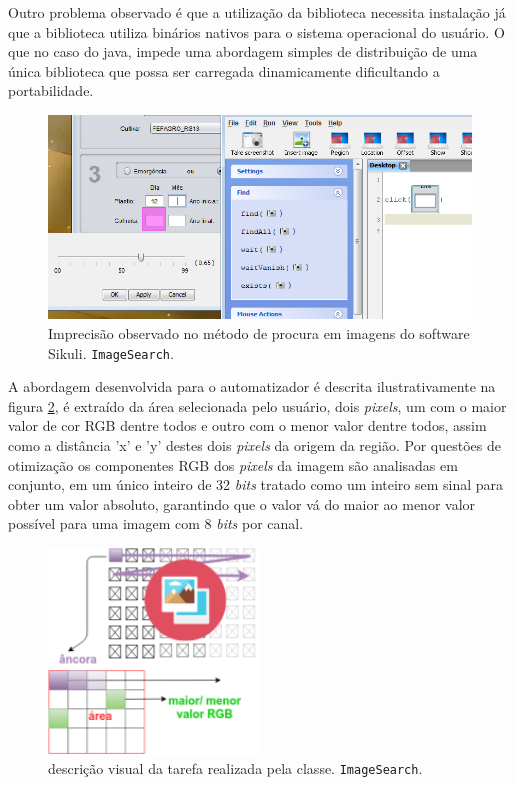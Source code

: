 \documentclass[tg]{mdtufsm}
\begin{document}
                    Outro problema observado é que a utilização da biblioteca necessita instalação já que a biblioteca utiliza binários nativos para o sistema operacional do usuário. O que no caso do java, impede uma abordagem simples de distribuição de uma única biblioteca que possa ser carregada dinamicamente dificultando a portabilidade.

                    \begin{figure}[!htb]
                        {\centering
                        \includegraphics[width=1.0\textwidth]{imagens/a.png}
                        \caption{Imprecisão observado no método de procura em imagens do software Sikuli. \texttt{ImageSearch}.}
                        \label{fig:sikulixNoMatch}}
                    \end{figure}

                    A abordagem desenvolvida para o automatizador é descrita ilustrativamente na figura \ref{fig:ImageSearch}, é extraído da área selecionada pelo usuário, dois \emph{pixels}, um com o maior valor de cor RGB dentre todos e outro com o menor valor dentre todos, assim como a distância 'x' e 'y' destes dois \emph{pixels} da origem da região. Por questões de otimização os componentes RGB dos \emph{pixels} da imagem são analisadas em conjunto, em um único inteiro de 32 \emph{bits} tratado como um inteiro sem sinal para obter um valor absoluto, garantindo que o valor vá do maior ao menor valor possível para uma imagem com 8 \emph{bits} por canal.

                    \begin{figure}[!htb]
                        {\centering
                        \includegraphics[width=0.5\textwidth]{imagens/searchImage.png}
                        \caption{descrição visual da tarefa realizada pela classe. \texttt{ImageSearch}.}
                        \label{fig:ImageSearch}}
                    \end{figure}
\end{document}
